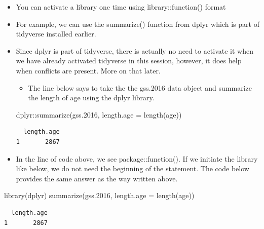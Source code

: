 \documentclass[
  letterpaper,
  DIV=11,
  numbers=noendperiod]{scrreprt}
\newenvironment{Shaded}{\begin{snugshade}}{\end{snugshade}}
\newcommand{\AttributeTok}[1]{\textcolor[rgb]{0.40,0.45,0.13}{#1}}
\newcommand{\FloatTok}[1]{\textcolor[rgb]{0.68,0.00,0.00}{#1}}
\newcommand{\FunctionTok}[1]{\textcolor[rgb]{0.28,0.35,0.67}{#1}}
\newcommand{\NormalTok}[1]{\textcolor[rgb]{0.00,0.23,0.31}{#1}}
\newcommand{\SpecialCharTok}[1]{\textcolor[rgb]{0.37,0.37,0.37}{#1}}
\providecommand{\tightlist}{%
  \setlength{\itemsep}{0pt}\setlength{\parskip}{0pt}}\usepackage{longtable,booktabs,array}
\begin{document}
\begin{itemize}
\item
  You can activate a library one time using library::function() format
\item
  For example, we can use the summarize() function from dplyr which is
  part of tidyverse installed earlier.
\item
  Since dplyr is part of tidyverse, there is actually no need to
  activate it when we have already activated tidyverse in this session,
  however, it does help when conflicts are present. More on that later.

  \begin{itemize}
  \tightlist
  \item
    The line below says to take the the gss.2016 data object and
    summarize the length of age using the dplyr library.
  \end{itemize}

\begin{Shaded}
\begin{Highlighting}[]
\NormalTok{dplyr}\SpecialCharTok{::}\FunctionTok{summarize}\NormalTok{(gss}\FloatTok{.2016}\NormalTok{, }\AttributeTok{length.age =} \FunctionTok{length}\NormalTok{(age))}
\end{Highlighting}
\end{Shaded}

\begin{verbatim}
  length.age
1       2867
\end{verbatim}
\item
  In the line of code above, we see package::function(). If we initiate
  the library like below, we do not need the beginning of the statement.
  The code below provides the same answer as the way written above.
\end{itemize}

\begin{Shaded}
\begin{Highlighting}[]
\FunctionTok{library}\NormalTok{(dplyr)}
\FunctionTok{summarize}\NormalTok{(gss}\FloatTok{.2016}\NormalTok{, }\AttributeTok{length.age =} \FunctionTok{length}\NormalTok{(age))}
\end{Highlighting}
\end{Shaded}

\begin{verbatim}
  length.age
1       2867
\end{verbatim}
\end{document}
